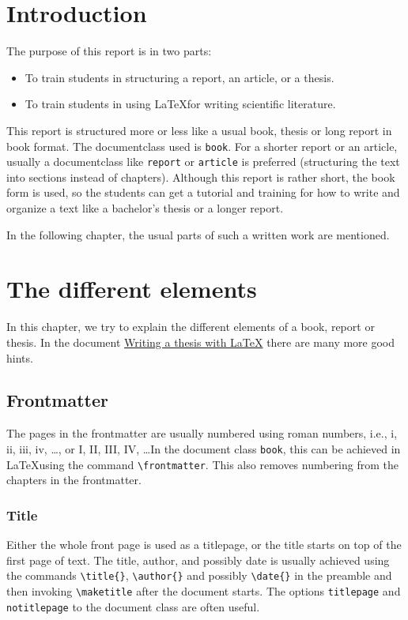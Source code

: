 \documentclass[a4paper,12pt,twoside,openright,titlepage]{book}
\begin{document}
\chapter{Introduction}
The purpose of this report is in two parts:
\begin{itemize}
\item To train students in structuring a report, an article, or a thesis.
\item To train students in using \LaTeX for writing scientific literature. 
\end{itemize}
This report is structured more or less like a usual book, thesis or long report in book format. The documentclass used is \texttt{book}. For a shorter report or an article, usually a documentclass like \texttt{report} or \texttt{article} is preferred (structuring the text into sections instead of chapters). 
Although this report is rather short, the book form is used, so the students can get a tutorial and training for how to write and organize a text like a bachelor's thesis or a longer report.  

In the following chapter, the usual parts of such a written work are mentioned. 

\chapter{The different elements}
In this chapter, we try to explain the different elements of a book, report or thesis. In the document \hyperlink{https://tug.org/pracjourn/2008-1/mori/mori.pdf}{Writing a thesis with \LaTeX} there are many more good hints.

\section{Frontmatter}
The pages in the frontmatter are usually numbered using roman numbers, i.e., i, ii, iii, iv, \ldots, or I, II, III, IV, \ldots In the document class \texttt{book}, this can be achieved in \LaTeX using the command 
\texttt{\textbackslash frontmatter}. This also removes numbering from the chapters in the frontmatter.
\subsection{Title}
Either the whole front page is used as a titlepage, or the title starts on top of the first page of text. The title, author, and possibly date is usually achieved using the commands \texttt{\textbackslash title\{\}}, \texttt{\textbackslash author\{\}} and possibly \texttt{\textbackslash date\{\}} in the preamble and then invoking \texttt{\textbackslash maketitle} after the document starts. The options \texttt{titlepage} and \texttt{notitlepage} to the document class are often useful. 
\end{document}
